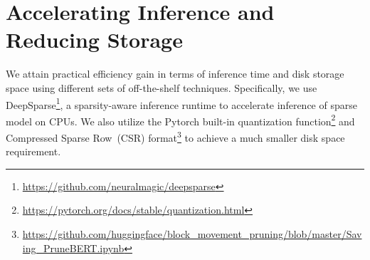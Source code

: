 \documentclass[11pt]{article}
\begin{document}
\section{Accelerating Inference and Reducing Storage}
We attain practical efficiency gain in terms of inference time and disk storage space using different sets of off-the-shelf techniques. Specifically, we use DeepSparse\footnote{\url{https://github.com/neuralmagic/deepsparse}}, a sparsity-aware inference runtime to accelerate inference of sparse model on CPUs. We also utilize the Pytorch built-in quantization function\footnote{\url{https://pytorch.org/docs/stable/quantization.html}} and Compressed Sparse Row~(CSR) format\footnote{\url{https://github.com/huggingface/block_movement_pruning/blob/master/Saving_PruneBERT.ipynb}} to achieve a much smaller disk space requirement.
	
\end{document}
